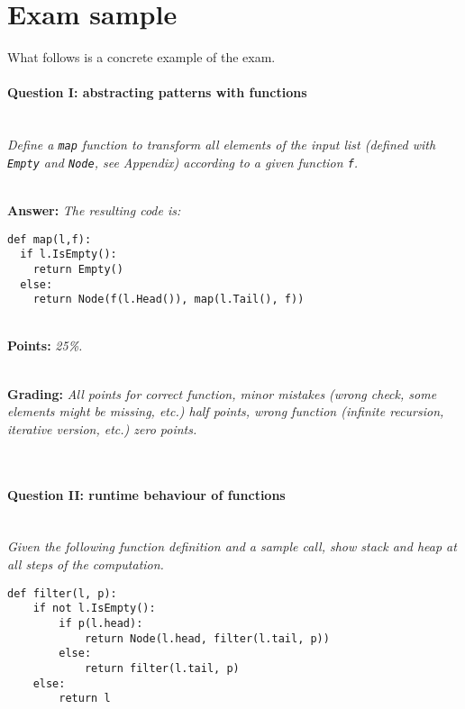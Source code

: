 \section*{Exam sample}
What follows is a concrete example of the exam.


\paragraph{Question I: abstracting patterns with functions} \ \\

\textit{Define a \texttt{map} function to transform all elements of the input list (defined with \texttt{Empty} and \texttt{Node}, see Appendix) according to a given function \texttt{f}.}

\ \\ 

\textbf{Answer:} \textit{The resulting code is:}

\begin{lstlisting}
def map(l,f):
  if l.IsEmpty():
    return Empty()
  else:
    return Node(f(l.Head()), map(l.Tail(), f))
\end{lstlisting}

\ \\ 

\textbf{Points:} \textit{25\%.}

\ \\ 

\textbf{Grading:} \textit{All points for correct function, minor mistakes (wrong check, some elements might be missing, etc.) half points, wrong function (infinite recursion, iterative version, etc.) zero points.}

\ \\ 

\paragraph{Question II: runtime behaviour of functions} \ \\

\textit{Given the following function definition and a sample call, show stack and heap at all steps of the computation.}

\begin{lstlisting}
def filter(l, p):
    if not l.IsEmpty():
        if p(l.head):
            return Node(l.head, filter(l.tail, p))
        else:
            return filter(l.tail, p)
    else:
        return l
\end{lstlisting}

